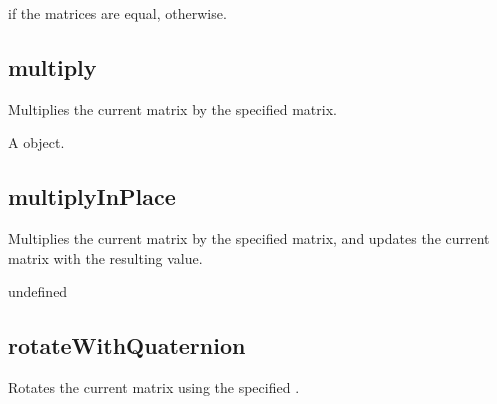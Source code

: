 \documentclass[letterpaper,12pt,english,openany,oneside]{sphinxmanual}
\begin{document}
\label{\detokenize{JS_3D_API:section-44}}\label{\detokenize{JS_3D_API:returns-39}}

  if the matrices are equal,  otherwise.


\subsection{multiply}
\label{\detokenize{JS_3D_API:multiply}}
Multiplies the current matrix by the specified matrix.

\label{\detokenize{JS_3D_API:syntax-39}}

\begin{sphinxVerbatim}[commandchars=\\\{\}]
\end{sphinxVerbatim}
\label{\detokenize{JS_3D_API:parameters-26}}

\label{\detokenize{JS_3D_API:section-45}}\label{\detokenize{JS_3D_API:returns-40}}

A  object.


\subsection{multiplyInPlace}
\label{\detokenize{JS_3D_API:multiplyinplace}}
Multiplies the current matrix by the specified matrix, and updates the current matrix with the resulting value.

\label{\detokenize{JS_3D_API:syntax-40}}

\begin{sphinxVerbatim}[commandchars=\\\{\}]
\end{sphinxVerbatim}
\label{\detokenize{JS_3D_API:parameters-27}}

\label{\detokenize{JS_3D_API:section-46}}\label{\detokenize{JS_3D_API:returns-41}}

undefined


\subsection{rotateWithQuaternion}
\label{\detokenize{JS_3D_API:rotatewithquaternion}}
Rotates the current matrix using the specified .
\end{document}
